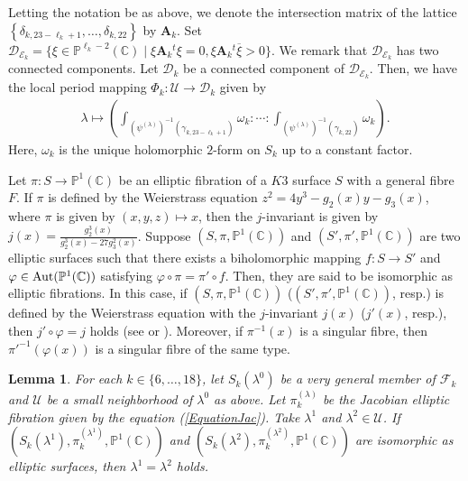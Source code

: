 \documentclass[10pt]{article}
\newtheorem{lem}{Lemma}[section]
\begin{document}
Letting the notation be as above, we denote the intersection matrix of the lattice $\left\{ \delta_{k,23-\ell_k+1 },\ldots, \delta_{k,22}\right\}$ by $\textbf{A}_k$.
Set 
$\mathcal{D}_{\mathcal{E}_k}
=\{ \xi \in \mathbb{P}^{\ell_k-2} (\mathbb{C})\mid
\xi \textbf{A}_k {}^t \xi=0, \xi \textbf{A}_k {}^t \overline{\xi}>0\}$.
We remark that $\mathcal{D}_{\mathcal{E}_k}$ has two connected components.
Let $\mathcal{D}_k$ be a connected component of $\mathcal{D}_{\mathcal{E}_k}$.
Then, we have the local period mapping
$\Phi_k : \mathcal{U} \rightarrow \mathcal{D}_k$ given by
\begin{align}\label{PhiInt}
\lambda \mapsto \left(\int_{(\psi^{(\lambda)})^{-1}\left(\gamma_{k,23-\ell_k +1} \right) }  \omega_k : \cdots  :  \int_{(\psi^{(\lambda)})^{-1}\left(\gamma_{k,22} \right) }  \omega_k\right).
\end{align}
Here, $\omega_k$ is the unique holomorphic $2$-form on $S_k$ up to a constant factor.


 
Let $\pi: S\rightarrow \mathbb{P}^1 (\mathbb{C})$ be an elliptic fibration of a $K3$ surface $S$ with a general fibre $F$. 
If  $\pi$ is defined by the Weierstrass equation
$z^2 =4 y^3 -g_2(x) y - g_3(x)$, where $\pi $ is given by $(x,y,z)\mapsto x$,
then the $j$-invariant is given by
$j(x)=\frac{g_2^3(x)}{g_2^3(x)-27 g_3^2(x)}$.
Suppose $(S,\pi,\mathbb{P}^1(\mathbb{C}))$ and $(S',\pi',\mathbb{P}^1(\mathbb{C}))$ are two elliptic surfaces 
such that there exists a biholomorphic mapping $f: S \rightarrow S'$ and $\varphi \in {\rm Aut}(\mathbb{P}^1(\mathbb{C}))$
satisfying $\varphi \circ \pi = \pi' \circ f$.
Then, they are said to be isomorphic as elliptic fibrations.
In this case,
if $(S,\pi,\mathbb{P}^1(\mathbb{C}))$ ($(S',\pi',\mathbb{P}^1(\mathbb{C}))$, resp.) is defined by the Weierstrass equation with the $j$-invariant $j (x)$ ($j' (x)$, resp.),
then $j' \circ \varphi  = j$ holds (see \cite{Kod} or \cite{Ne}).
Moreover, 
if $\pi^{-1} (x)$ is a singular fibre,
then  $\pi'^{-1} (\varphi (x))$ is a singular fibre of the same type.


\begin{lem}\label{LemPsi}
For each $k\in \{6,\ldots,18\}$, let $S_k (\lambda^0)$ be a very general member of $\mathscr{F}_k$ and $\mathcal{U} $ be a small neighborhood of $\lambda^0$ as above.
Let $\pi_k^{(\lambda)}$ be the Jacobian elliptic fibration given by the equation (\ref{EquationJac}).
Take $\lambda^1$ and $\lambda^2 \in \mathcal{U}$.
If $\left(S_k(\lambda^1), \pi_k^{\left( \lambda^1 \right)}, \mathbb{P}^1 (\mathbb{C}) \right)$ and  $\left(S_k(\lambda^2), \pi_k^{\left( \lambda^2 \right)}, \mathbb{P}^1 (\mathbb{C}) \right)$ are isomorphic as elliptic surfaces,
then $\lambda^1 = \lambda^2$ holds.
\end{lem}
\end{document}
